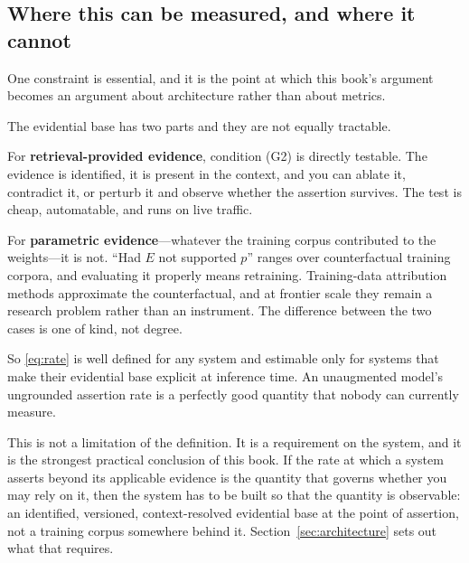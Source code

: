 \subsection{Where this can be measured, and where it cannot}
\label{sec:measurability}

One constraint is essential, and it is the point at which this book's argument
becomes an argument about architecture rather than about metrics.

The evidential base has two parts and they are not equally tractable.

For \textbf{retrieval-provided evidence}, condition (G2) is directly testable.
The evidence is identified, it is present in the context, and you can ablate it,
contradict it, or perturb it and observe whether the assertion survives. The test
is cheap, automatable, and runs on live traffic.

For \textbf{parametric evidence}---whatever the training corpus contributed to the
weights---it is not. ``Had $E$ not supported $p$'' ranges over counterfactual
training corpora, and evaluating it properly means retraining. Training-data
attribution methods approximate the counterfactual, and at frontier scale they
remain a research problem rather than an instrument. The difference between the two
cases is one of kind, not degree.

So \eqref{eq:rate} is well defined for any system and estimable only for systems
that make their evidential base explicit at inference time. An unaugmented model's
ungrounded assertion rate is a perfectly good quantity that nobody can currently
measure.

This is not a limitation of the definition. It is a requirement on the system, and
it is the strongest practical conclusion of this book. If the rate at which a
system asserts beyond its applicable evidence is the quantity that governs whether
you may rely on it, then the system has to be built so that the quantity is
observable: an identified, versioned, context-resolved evidential base at the
point of assertion, not a training corpus somewhere behind it.
Section~\ref{sec:architecture} sets out what that requires.
